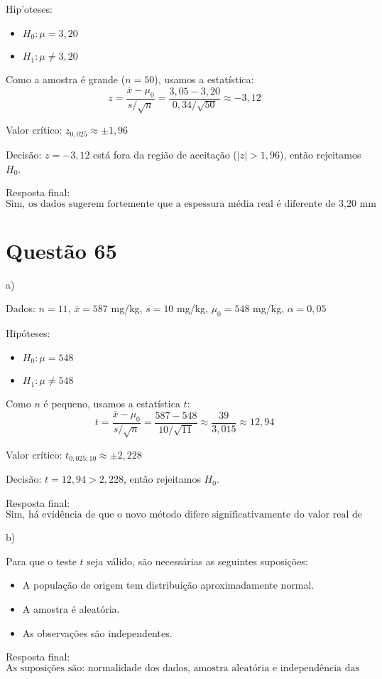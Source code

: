 \documentclass[12pt]{article}
\newcommand{\quest}[1]{\section*{Questão #1}} %
\begin{document}
Hip'oteses:
\begin{itemize}
  \item $H_0: \mu = 3{,}20$
  \item $H_1: \mu \neq 3{,}20$
\end{itemize}

Como a amostra \'{e} grande ($n = 50$), usamos a estat\'istica:
\[
z = \frac{\bar{x} - \mu_0}{s / \sqrt{n}} = \frac{3{,}05 - 3{,}20}{0{,}34 / \sqrt{50}} \approx -3{,}12
\]

Valor cr\'itico: $z_{0{,}025} \approx \pm 1{,}96$

Decis\~ao: $z = -3{,}12$ est\'a fora da regi\~ao de aceita\c{c}\~ao ($|z| > 1{,}96$), ent\~ao rejeitamos $H_0$.

Resposta final:
\[
\boxed{\text{Sim, os dados sugerem fortemente que a espessura m\'edia real \'{e} diferente de 3{,}20 mm}}
\]

\quest{65}

a)

Dados: $n = 11$, $\bar{x} = 587$ mg/kg, $s = 10$ mg/kg, $\mu_0 = 548$ mg/kg, $\alpha = 0{,}05$

Hipóteses:
\begin{itemize}
  \item $H_0: \mu = 548$
  \item $H_1: \mu \neq 548$
\end{itemize}

Como $n$ é pequeno, usamos a estatística $t$:
\[
t = \frac{\bar{x} - \mu_0}{s / \sqrt{n}} = \frac{587 - 548}{10 / \sqrt{11}} \approx \frac{39}{3{,}015} \approx 12{,}94
\]

Valor crítico: $t_{0{,}025; 10} \approx \pm 2{,}228$

Decisão: $t = 12{,}94 > 2{,}228$, então rejeitamos $H_0$.

Resposta final:
\[
\boxed{\text{Sim, há evidência de que o novo método difere significativamente do valor real de 548 mg/kg}}
\]

b)

Para que o teste $t$ seja válido, são necessárias as seguintes suposições:
\begin{itemize}
  \item A população de origem tem distribuição aproximadamente normal.
  \item A amostra é aleatória.
  \item As observações são independentes.
\end{itemize}

Resposta final:
\[
\boxed{\text{As suposições são: normalidade dos dados, amostra aleatória e independência das observações}}
\]
\end{document}
